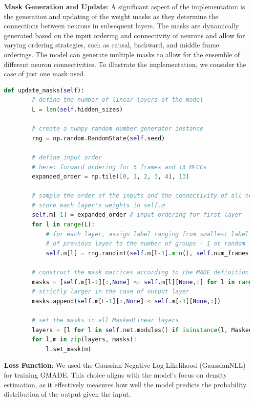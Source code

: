 \textbf{Mask Generation and Update}: A significant aspect of the implementation is the generation and updating of the weight masks as they determine the connections between neurons in subsequent layers. The masks are dynamically generated based on the input ordering and connectivity of neurons and allow for varying ordering strategies, such as causal, backward, and middle frame orderings. The model can generate multiple masks to allow for the ensemble of different neuron connectivities. To illustrate the implementation, we consider the case of just one mask used.
\begin{lstlisting}[language=Python,caption={PyTorch implementation of the mask generation, adapted from Karpathy, Andrej (2018)~\cite{githubMADE}}]
    def update_masks(self):
        # define the number of linear layers of the model
        L = len(self.hidden_sizes)
        
        # create a numpy random number generator instance
        rng = np.random.RandomState(self.seed)

        # define input order
        # here: forward ordering for 5 frames and 13 MFCCs
        expanded_order = np.tile([0, 1, 2, 3, 4], 13)
        
        # sample the order of the inputs and the connectivity of all neurons
        # store each layer's weights in self.m
        self.m[-1] = expanded_order # input ordering for first layer
        for l in range(L):
            # for each layer, assign label ranging from smallest label
            # of previous layer to the number of groups - 1 at random
            self.m[l] = rng.randint(self.m[l-1].min(), self.num_frames-1, size=self.hidden_sizes[l])
        
        # construct the mask matrices according to the MADE definition
        masks = [self.m[l-1][:,None] <= self.m[l][None,:] for l in range(L)]
        # strictly larger in the case of output layer
        masks.append(self.m[L-1][:,None] < self.m[-1][None,:])
        
        # set the masks in all MaskedLinear layers
        layers = [l for l in self.net.modules() if isinstance(l, MaskedLinear)]
        for l,m in zip(layers, masks):
            l.set_mask(m)
\end{lstlisting}
\textbf{Loss Function}: We used the Gaussian Negative Log Likelihood (GaussianNLL) for training GMADE. This choice aligns with the model's focus on density estimation, as it effectively measures how well the model predicts the probability distribution of the output given the input.
